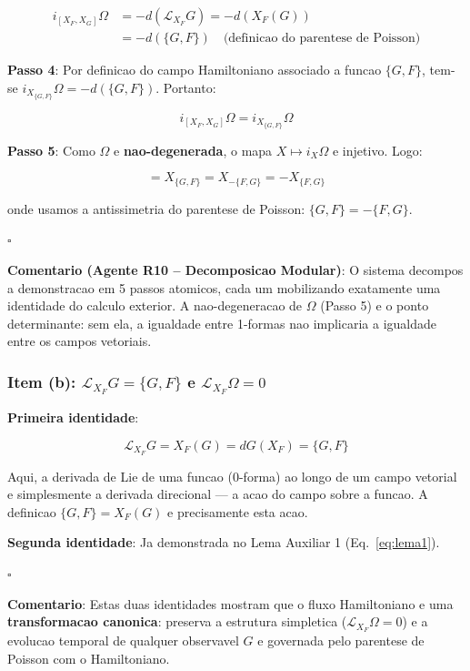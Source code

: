 \documentclass[5p]{elsarticle}
\begin{document}
\begin{align}
i_{[X_F, X_G]}\Omega &= -d(\mathcal{L}_{X_F}G) = -d(X_F(G)) \nonumber\\
&= -d(\{G,F\}) \quad\text{(definicao do parentese de Poisson)} \nonumber
\end{align}

\textbf{Passo 4}: Por definicao do campo Hamiltoniano associado a
funcao $\{G,F\}$, tem-se $i_{X_{\{G,F\}}}\Omega = -d(\{G,F\})$.
Portanto:

\begin{equation}
i_{[X_F, X_G]}\Omega = i_{X_{\{G,F\}}}\Omega
\end{equation}

\textbf{Passo 5}: Como $\Omega$ e \textbf{nao-degenerada}, o mapa
$X \mapsto i_X\Omega$ e injetivo. Logo:

\begin{equation}
[X_F, X_G] = X_{\{G,F\}} = X_{-\{F,G\}} = -X_{\{F,G\}}
\end{equation}

onde usamos a antissimetria do parentese de Poisson: $\{G,F\} = -\{F,G\}$.

$\square$

\textbf{Comentario (Agente R10 -- Decomposicao Modular)}: O sistema
decompos a demonstracao em 5 passos atomicos, cada um mobilizando
exatamente uma identidade do calculo exterior. A nao-degeneracao de
$\Omega$ (Passo 5) e o ponto determinante: sem ela, a igualdade entre
1-formas nao implicaria a igualdade entre os campos vetoriais.

\subsubsection*{Item (b): $\mathcal{L}_{X_F}G = \{G,F\}$ e $\mathcal{L}_{X_F}\Omega = 0$}

\textbf{Primeira identidade}:

\begin{equation}
\mathcal{L}_{X_F}G = X_F(G) = dG(X_F) = \{G,F\}
\end{equation}

Aqui, a derivada de Lie de uma funcao (0-forma) ao longo de um campo
vetorial e simplesmente a derivada direcional --- a acao do campo sobre
a funcao. A definicao $\{G,F\} = X_F(G)$ e precisamente esta acao.

\textbf{Segunda identidade}: Ja demonstrada no Lema Auxiliar 1
(Eq.~\ref{eq:lema1}).

$\square$

\textbf{Comentario}: Estas duas identidades mostram que o fluxo
Hamiltoniano e uma \textbf{transformacao canonica}: preserva a
estrutura simpletica ($\mathcal{L}_{X_F}\Omega = 0$) e a evolucao
temporal de qualquer observavel $G$ e governada pelo parentese de
Poisson com o Hamiltoniano.
\end{document}
